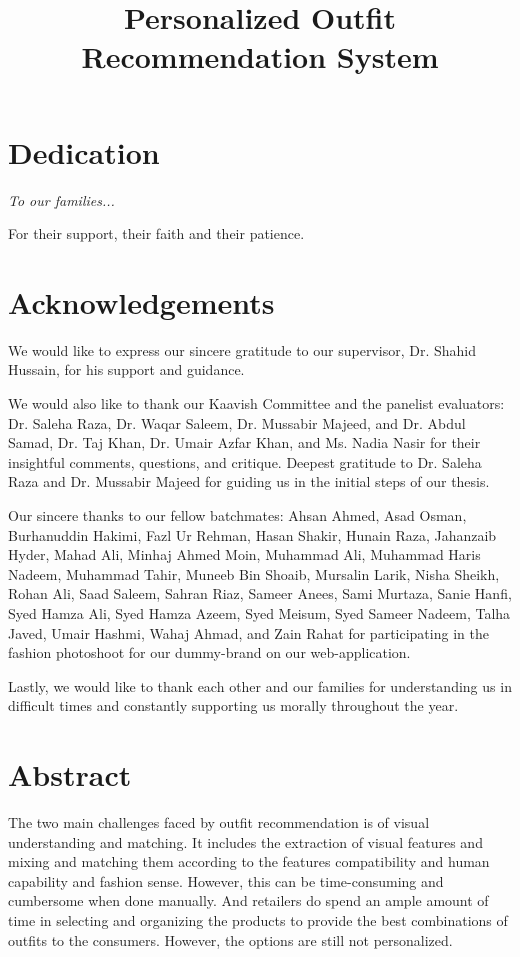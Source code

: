 \documentclass[12pt]{report}
\title{Personalized Outfit Recommendation System}
\begin{document}


\chapter*{Dedication}
\begin{center} \textit{To our families...}

For their support, their faith and their patience.
\end{center}

\chapter*{Acknowledgements}
We would like to express our sincere gratitude to our supervisor, Dr. Shahid Hussain, for his support and guidance.\newline 

We would also like to thank our Kaavish Committee and the panelist evaluators: Dr. Saleha Raza, Dr. Waqar Saleem, Dr. Mussabir Majeed, and Dr. Abdul Samad, Dr. Taj Khan, Dr. Umair Azfar Khan, and Ms. Nadia Nasir for their insightful comments, questions, and critique. Deepest gratitude to Dr. Saleha Raza and Dr. Mussabir Majeed for guiding us in the initial steps of our thesis. \newline

Our sincere thanks to our fellow batchmates: Ahsan Ahmed, Asad Osman, Burhanuddin Hakimi, Fazl  Ur Rehman, Hasan Shakir, Hunain Raza,  Jahanzaib Hyder, Mahad Ali, Minhaj Ahmed Moin,  Muhammad Ali, Muhammad Haris Nadeem, Muhammad Tahir, Muneeb Bin Shoaib, Mursalin Larik,  Nisha Sheikh, Rohan Ali, Saad Saleem, Sahran Riaz, Sameer Anees, Sami Murtaza, Sanie Hanfi, Syed Hamza Ali, Syed Hamza Azeem, Syed Meisum, Syed Sameer Nadeem, Talha Javed, Umair Hashmi, Wahaj Ahmad, and Zain Rahat for participating in the fashion photoshoot for our dummy-brand on our web-application.\newline

Lastly, we would like to thank each other and our families for understanding us in difficult times and constantly supporting us morally throughout the year.

\chapter*{Abstract}
The two main challenges faced by outfit recommendation is of visual understanding and matching. It includes the extraction of visual features and mixing and matching them according to the features compatibility and human capability and fashion sense. However, this can be time-consuming and cumbersome when done manually. And retailers do spend an ample amount of time in selecting and organizing the products to provide the best combinations of outfits to the consumers. However, the options are still not personalized. \newline
\end{document}
